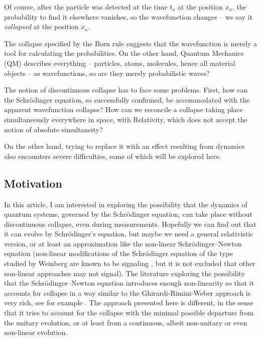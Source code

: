 \documentclass[11pt]{amsart}
\theoremstyle{definition}
\theoremstyle{plain}
\begin{document}
Of course, after the particle was detected at the time $t_a$ at the position $x_a$, the probability to find it elsewhere vanishes, so the wavefunction changes --  we say it \emph{collapsed} at the position $x_a$.

The collapse specified by the Born rule suggests that the wavefunction is merely a tool for calculating the probabilities.
On the other hand, Quantum Mechanics (QM) describes everything -- particles, atoms, molecules, hence all material objects -- as wavefunctions, so are they merely probabilistic waves?

The notion of discontinuous collapse has to face some problems. First, how can the Schr\"odinger equation, so successfully confirmed, be accommodated with the apparent wavefunction collapse? How can we reconcile a collapse taking place simultaneously everywhere in space, with Relativity, which does not accept the notion of absolute simultaneity?

On the other hand, trying to replace it with an effect resulting from dynamics also encounters severe difficulties, some of which will be explored here.

\subsection{Motivation}

In this article, I am interested in exploring the possibility that the dynamics of quantum systems, governed by the Schr\"odinger equation, can take place without discontinuous collapse, even during measurements. Hopefully we can find out that it can evolve by Schr\"odinger's equation, but maybe we need a general relativistic version, or at least an approximation like the non-linear Schr\"odinger--Newton equation \cite{RuffiniBonazzola1969SchrodingerNewtonEquation} (non-linear modifications of the Schr\"odinger equation of the type studied by Weinberg are known to be signaling \cite{gisin1990weinbergSignaling}, but it is not excluded that other non-linear approaches may not signal). The literature exploring the possibility that the Schr\"odinger--Newton equation introduces enough non-linearity so that it accounts for collapse in a way similar to the Ghirardi-Rimini-Weber approach \cite{GRW86} is very rich, see for example \cite{diosi1984gravitationQMlocalization,penrose1996gravityQuantumStateReduction}. The approach presented here is different, in the sense that it tries to account for the collapse with the minimal possible departure from the unitary evolution, or at least from a continuous, albeit non-unitary or even non-linear evolution.
\end{document}
